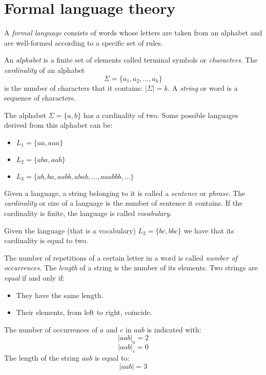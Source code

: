 \section{Formal language theory}

A \emph{formal language} consists of words whose letters are taken from an alphabet and are well-formed according to a specific set of rules.
\begin{definition}
    An \emph{alphabet} is a finite set of elements called terminal symbols or \emph{characters}. 
    The \emph{cardinality} of an alphabet \[\Sigma =\{ a_1,a_2,\dots, a_k \}\] is the number of characters that it contains: $\left\lvert \Sigma \right\rvert = k$. 
    A \emph{string} or word is a sequence of characters. 
\end{definition}
\begin{example}
    The alphabet $\Sigma =\{ a,b \}$ has a cardinality of two. Some possible languages derived from this alphabet can be:
    \begin{itemize}
        \item $L_1=\{aa,aaa\}$
        \item $L_2=\{aba,aab\}$
        \item $L_3=\{ab,ba,aabb,abab,\dots,aaabbb,\dots\}$
    \end{itemize}
\end{example}
\begin{definition}
    Given a language, a string belonging to it is called a \emph{sentence} or \emph{phrase}. The \emph{cardinality} or size of a language is the number of sentence it contains.
    If the cardinality is finite, the language is called \emph{vocabulary}. 
\end{definition}
\begin{example}
    Given the language (that is a vocabulary) $L_2=\{ bc,bbc \}$ we have that its cardinality is equal to two. 
\end{example}
\begin{definition}
    The number of repetitions of a certain letter in a word is called \emph{number of occurrences}. The \emph{length} of a string is the number of its elements. 
    Two strings are \emph{equal} if and only if: 
    \begin{itemize}
        \item They have the same length.
        \item Their elements, from left to right, coincide. 
    \end{itemize}
\end{definition}
\begin{example}
    The number of occurrences of $a$ and $c$ in $aab$ is indicated with:
    \[{\left\lvert aab \right\rvert}_a = 2\]
    \[{\left\lvert aab \right\rvert}_c = 0\]
    The length of the string $aab$ is equal to: 
    \[\left\lvert aab \right\rvert = 3\]
\end{example}